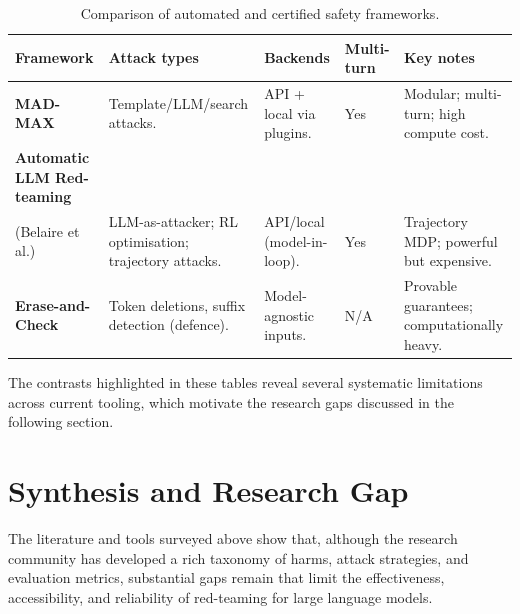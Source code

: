 \begin{table}[H]
\centering
\scriptsize
\setlength{\extrarowheight}{2pt}
\begin{tabularx}{\linewidth}{l 
  >{\raggedright\arraybackslash}p{2.8cm} 
  >{\raggedright\arraybackslash}p{2.6cm} 
  >{\centering\arraybackslash}p{1.2cm} 
  >{\raggedright\arraybackslash}p{2.8cm}}
\toprule
\textbf{Framework} & \textbf{Attack types} & \textbf{Backends} & \textbf{Multi-turn} & \textbf{Key notes} \\
\midrule

\textbf{MAD-MAX}~\cite{schoepf2025madmax} &
Template/LLM/search attacks. &
API + local via plugins. &
Yes &
Modular; multi-turn; high compute cost. \\
\addlinespace[2pt]

\textbf{Automatic LLM Red-teaming} \\ (Belaire et al.)~\cite{belaire2025automatic} &
LLM-as-attacker; RL optimisation; trajectory attacks. &
API/local (model-in-loop). &
Yes &
Trajectory MDP; powerful but expensive. \\
\addlinespace[2pt]

\textbf{Erase-and-Check}~\cite{kumar2025certifying} &
Token deletions, suffix detection (defence). &
Model-agnostic inputs. &
N/A &
Provable guarantees; computationally heavy. \\
\bottomrule
\end{tabularx}
\caption{Comparison of automated and certified safety frameworks.}
\label{tab:automated}
\end{table}

The contrasts highlighted in these tables reveal several systematic limitations across current tooling, which motivate the research gaps discussed in the following section.

\newpage{}

\section{Synthesis and Research Gap}\label{sec:gaps}

The literature and tools surveyed above show that, although the research community has developed a rich taxonomy of harms, attack strategies, and evaluation metrics, substantial gaps remain that limit the effectiveness, accessibility, and reliability of red-teaming for large language models.

